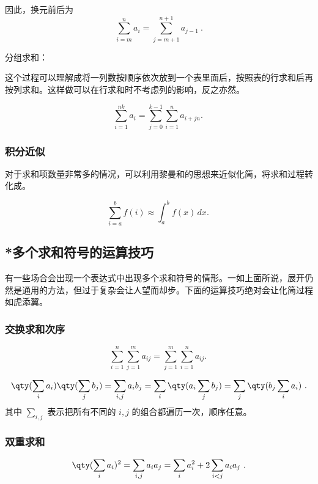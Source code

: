 因此，换元前后为
\begin{equation}
\sum\limits_{i=m}^n a_i = \sum_{j=m+1}^{n+1} a_{j-1} ~.
\end{equation}

分组求和：

这个过程可以理解成将一列数按顺序依次放到一个表里面后，按照表的行求和后再按列求和。这样做可以在行求和时不考虑列的影响，反之亦然。

\begin{equation}
\sum_{i=1}^{nk} a_i = \sum_{j=0}^{k-1} \sum_{i=1}^n a_{i+jn}.~
\end{equation}

\subsubsection{积分近似}

对于求和项数量非常多的情况，可以利用黎曼和的思想来近似化简，将求和过程转化成。

\begin{equation}
\sum_{i=a}^b f(i) \approx \int_a^b f(x) \, dx.~
\end{equation}


\subsection{*多个求和符号的运算技巧}

有一些场合会出现一个表达式中出现多个求和符号的情形。一如上面所说，展开仍然是通用的方法，但过于复杂会让人望而却步。下面的运算技巧绝对会让化简过程如虎添翼。

\subsubsection{交换求和次序}

\begin{equation}
\sum_{i=1}^n \sum_{j=1}^m a_{ij} = \sum_{j=1}^m \sum_{i=1}^n a_{ij}.~
\end{equation}


\begin{equation}
\qty(\sum_i a_i) \qty(\sum_j b_j) = \sum_{i,j} a_i b_j = \sum_i \qty(a_i \sum_j b_j) = \sum_j \qty(b_j \sum_i a_i)~.
\end{equation}
其中 $\sum\limits_{i,j}$ 表示把所有不同的 $i,j$ 的组合都遍历一次，顺序任意。

\subsubsection{双重求和}
\begin{equation}
\qty(\sum_i a_i)^2 = \sum_{i,j} a_i a_j = \sum_i a_i^2 + 2\sum_{i<j} a_i a_j~.
\end{equation}

